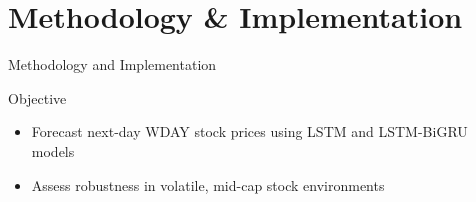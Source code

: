 \section{Methodology \& Implementation} 

\begin{frame}[label=methodologyimplementation]{Methodology and Implementation}

\begin{block}{Objective}
    \begin{itemize}
        \item Forecast next-day WDAY stock prices using LSTM and LSTM-BiGRU models
        \item Assess robustness in volatile, mid-cap stock environments
    \end{itemize}
\end{block}

\end{frame}


